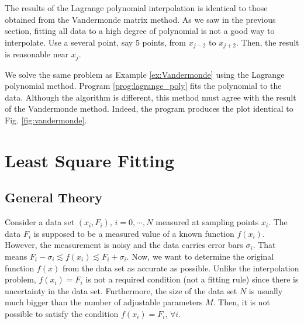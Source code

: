 The results of the Lagrange polynomial interpolation is identical to those obtained from the Vandermonde matrix method.  As we saw in the previous section, fitting all data to a high degree of polynomial is not a good way to interpolate. Use a several point, say 5 points, from $x_{j-2}$ to $x_{j+2}$. Then, the result is reasonable near $x_j$.

\bigskip
\begin{example}

We solve the same problem as Example \ref{ex:Vandermonde} using the Lagrange polynomial method.  Program \ref{prog:lagrange_poly} fits the polynomial to the data.  Although the algorithm is different, this method must agree with the result of the Vandermonde method.
Indeed, the program produces the plot identical to Fig. \ref{fig:vandermonde}.
\end{example}





\noindent
\section{Least Square Fitting}


\subsection{General Theory}

Consider  a data set $(x_i, F_i),\, i=0,\cdots, N$ measured at sampling points $x_i$.  The data $F_i$ is supposed to be a measured value of a known function $f(x_i)$.  However, the measurement is noisy and the data carries error bars $\sigma_i$. That means $ F_i - \sigma_i \lesssim f(x_i) \lesssim F_i + \sigma_i$.   Now, we want to determine the original function $f(x)$ from the data set as accurate as possible.  Unlike the interpolation problem,  $f(x_i)=F_i$ is not a required condition (not a fitting rule) since there is uncertainty in the data set.  Furthermore, the size of the data set $N$ is usually much bigger than the number of adjustable parameters $M$. Then, it is not possible to satisfy the condition  $f(x_i)=F_i,\, \forall i$.   

